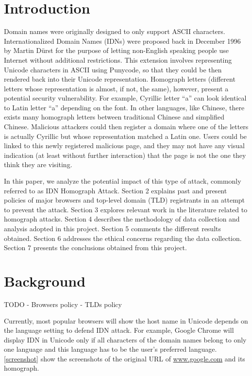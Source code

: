 \documentclass[letterpaper,twocolumn,10pt]{article}
\begin{document}
\section{Introduction}
Domain names were originally designed to only support ASCII characters.
Internationalized Domain Names (IDNs) were proposed back in December 1996 by Martin D\"{u}rst for the purpose of letting non-English speaking people use Internet without additional restrictions.
This extension involves representing Unicode characters in ASCII using Punycode, so that they could be then rendered back into their Unicode representation.
Homograph letters (different letters whose representation is almost, if not, the same), however, present a potential security vulnerability.
For example, Cyrillic letter ``a'' can look identical to Latin letter ``a'' depending on the font.
In other languages, like Chinese, there exists many homograph letters between traditional Chinese and simplified Chinese.
Malicious attackers could then register a domain where one of the letters is actually Cyrillic but whose representation matched a Latin one.
Users could be linked to this newly registered malicious page, and they may not have any visual indication (at least without further interaction) that the page is not the one they think they are visiting.

In this paper, we analyze the potential impact of this type of attack, commonly referred to as IDN Homograph Attack.
Section 2 explains past and present policies of major browsers and top-level domain (TLD) registrants in an attempt to prevent the attack.
Section 3 explores relevant work in the literature related to homograph attacks.
Section 4 describes the methodology of data collection and analysis adopted in this project.
Section 5 comments the different results obtained.
Section 6 addresses the ethical concerns regarding the data collection.
Section 7 presents the conclusions obtained from this project.

\section{Background}
TODO
- Browsers policy
- TLDs policy

Currently, most popular browsers will show the host name in Unicode depends on the language setting to defend IDN attack.
For example, Google Chrome will display IDN in Unicode only if all characters of the domain names belong to only one language and this language has to be the user's preferred language. \ref{screenshot} show the screenshots of the original URL of \url{www.google.com} and its homograph.
\end{document}
